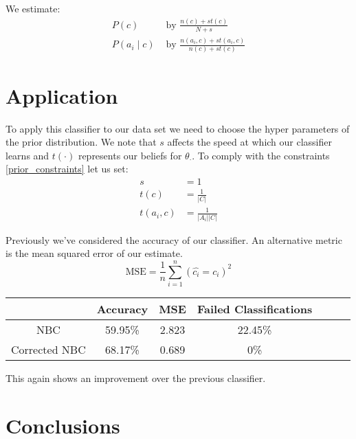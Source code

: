 We estimate:
\begin{align}
	P(c) & \text{ by } \frac{n(c) + st(c)}{N + s} \\
	P(a_i \mid c) & \text{ by } \frac{n(a_i, c) + st(a_i, c)}{n(c) + st(c)}
\end{align}

\section{Application}

To apply this classifier to our data set we need to choose the hyper parameters of the prior distribution.
We note that $s$ affects the speed at which our classifier learns and $t(\cdot)$ represents our beliefs for $\theta_\cdot$.
To comply with the constraints \ref{prior_constraints} let us set:
\begin{align}
	s & = 1 \\
	t(c) & = \frac{1}{|C|} \\
	t(a_i, c) & = \frac{1}{|A_i||C|}
\end{align}

Previously we've considered the accuracy of our classifier.
An alternative metric is the mean squared error of our estimate.
\begin{equation}
	\text{MSE} = \frac{1}{n}\sum_{i=1}^n(\hat{c_i} = c_i)^2
\end{equation}

\begin{center}
	\begin{tabular}{ c|c c c c c c }
		              & Accuracy & MSE   & Failed Classifications\\
		\hline
		NBC           & 59.95\%  & 2.823 & 22.45\% \\
		Corrected NBC & 68.17\%  & 0.689 & 0\%
	\end{tabular}
\end{center}

This again shows an improvement over the previous classifier.

\section{Conclusions}